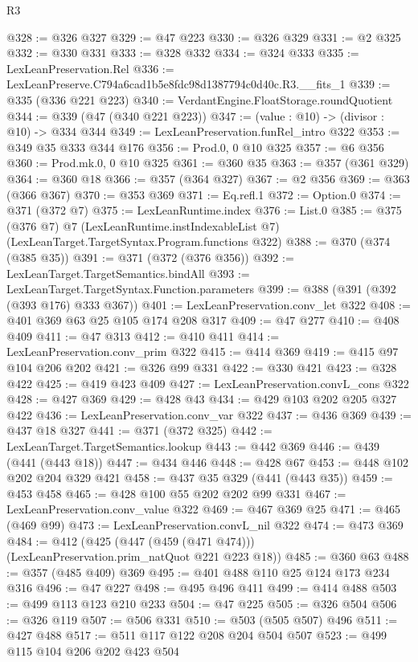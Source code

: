 \begin{lexlean}{R3}
\begin{coremodule}
@328 := @326 @327
@329 := @47 @223
@330 := @326 @329
@331 := @2 @325
@332 := @330 @331
@333 := @328 @332
@334 := @324 @333
@335 := LexLeanPreservation.Rel
@336 := LexLeanPreserve.C794a6cad1b5e8fdc98d1387794c0d40c.R3.__fits_1
@339 := @335 (@336 @221 @223)
@340 := VerdantEngine.FloatStorage.roundQuotient
@344 := @339 (@47 (@340 @221 @223))
@347 := (value : @10) -> (divisor : @10) -> @334 @344
@349 := LexLeanPreservation.funRel_intro @322
@353 := @349 @35 @333 @344 @176
@356 := Prod.{0, 0} @10 @325
@357 := @6 @356
@360 := Prod.mk.{0, 0} @10 @325
@361 := @360 @35
@363 := @357 (@361 @329)
@364 := @360 @18
@366 := @357 (@364 @327)
@367 := @2 @356
@369 := @363 (@366 @367)
@370 := @353 @369
@371 := Eq.refl.{1}
@372 := Option.{0}
@374 := @371 (@372 @7)
@375 := LexLeanRuntime.index
@376 := List.{0}
@385 := @375
    (@376 @7)
    @7
    (LexLeanRuntime.instIndexableList @7)
    (LexLeanTarget.TargetSyntax.Program.functions @322)
@388 := @370 (@374 (@385 @35))
@391 := @371 (@372 (@376 @356))
@392 := LexLeanTarget.TargetSemantics.bindAll
@393 := LexLeanTarget.TargetSyntax.Function.parameters
@399 := @388 (@391 (@392 (@393 @176) @333 @367))
@401 := LexLeanPreservation.conv_let @322
@408 := @401 @369 @63 @25 @105 @174 @208 @317
@409 := @47 @277
@410 := @408 @409
@411 := @47 @313
@412 := @410 @411
@414 := LexLeanPreservation.conv_prim @322
@415 := @414 @369
@419 := @415 @97 @104 @206 @202
@421 := @326 @99 @331
@422 := @330 @421
@423 := @328 @422
@425 := @419 @423 @409
@427 := LexLeanPreservation.convL_cons @322
@428 := @427 @369
@429 := @428 @43
@434 := @429 @103 @202 @205 @327 @422
@436 := LexLeanPreservation.conv_var @322
@437 := @436 @369
@439 := @437 @18 @327
@441 := @371 (@372 @325)
@442 := LexLeanTarget.TargetSemantics.lookup
@443 := @442 @369
@446 := @439 (@441 (@443 @18))
@447 := @434 @446
@448 := @428 @67
@453 := @448 @102 @202 @204 @329 @421
@458 := @437 @35 @329 (@441 (@443 @35))
@459 := @453 @458
@465 := @428 @100 @55 @202 @202 @99 @331
@467 := LexLeanPreservation.conv_value @322
@469 := @467 @369 @25
@471 := @465 (@469 @99)
@473 := LexLeanPreservation.convL_nil @322
@474 := @473 @369
@484 := @412 (@425 (@447 (@459 (@471 @474))) (LexLeanPreservation.prim_natQuot @221 @223 @18))
@485 := @360 @63
@488 := @357 (@485 @409) @369
@495 := @401 @488 @110 @25 @124 @173 @234 @316
@496 := @47 @227
@498 := @495 @496 @411
@499 := @414 @488
@503 := @499 @113 @123 @210 @233
@504 := @47 @225
@505 := @326 @504
@506 := @326 @119
@507 := @506 @331
@510 := @503 (@505 @507) @496
@511 := @427 @488
@517 := @511 @117 @122 @208 @204 @504 @507
@523 := @499 @115 @104 @206 @202 @423 @504

\end{coremodule}
\end{lexlean}
